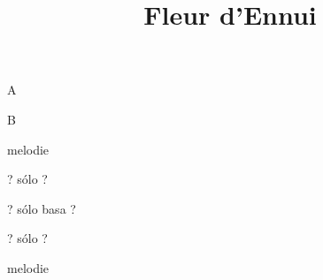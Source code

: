 \documentclass[timestamp]{jazzgrid}
\title{Fleur d'Ennui}
\begin{document}
\maketitle

\begin{musicsection}{A}
\barline
	{}
	{\barfour{}{}{}{}{}}
	{\barfour{}{}{}{}{}}
	{\barfour{}{}{}{}{}}
\barline
	{}
	{}
	{}
	{}
	{}
	{}
\end{musicsection}

\begin{musicsection}{B}
\barline
	{}
	{}
	{}
	{}
\barline
	{}
	{}
	{}
	{}
\end{musicsection}

\footnotesize
\begin{description}[noitemsep,align=right,labelwidth=\widthof{\bfseries{AABA}}]
	\item [AABA] melodie
	\item [AABA] ? sólo ?
	\item [AABA] ? sólo basa ?
	\item [AABA] ? sólo ?
	\item [AABA] melodie
\end{description}
\end{document}
